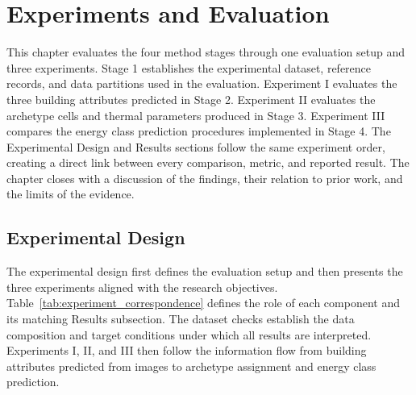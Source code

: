 \chapter{Experiments and Evaluation}
\label{ch:experiments}

This chapter evaluates the four method stages through one evaluation setup and three experiments. Stage 1 establishes the experimental dataset, reference records, and data partitions used in the evaluation. Experiment I evaluates the three building attributes predicted in Stage 2. Experiment II evaluates the archetype cells and thermal parameters produced in Stage 3. Experiment III compares the energy class prediction procedures implemented in Stage 4. The Experimental Design and Results sections follow the same experiment order, creating a direct link between every comparison, metric, and reported result. The chapter closes with a discussion of the findings, their relation to prior work, and the limits of the evidence.

\section{Experimental Design}
\label{sec:strategy_metrics}

The experimental design first defines the evaluation setup and then presents the three experiments aligned with the research objectives. Table~\ref{tab:experiment_correspondence} defines the role of each component and its matching Results subsection. The dataset checks establish the data composition and target conditions under which all results are interpreted. Experiments I, II, and III then follow the information flow from building attributes predicted from images to archetype assignment and energy class prediction.

